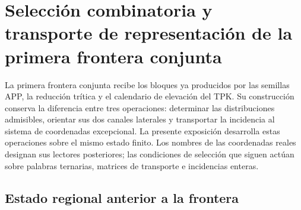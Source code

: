 
\section[Selección y transporte de la primera frontera]{Selección combinatoria y transporte de representación de la primera frontera conjunta}
\label{r36c:sec:frontera}

La primera frontera conjunta recibe los bloques ya producidos por las
semillas APP, la reducción trítica y el calendario de elevación del TPK.
Su construcción conserva la diferencia entre tres operaciones: determinar
las distribuciones admisibles, orientar sus dos canales laterales y
transportar la incidencia al sistema de coordenadas excepcional. La
presente exposición desarrolla estas operaciones sobre el mismo estado
finito. Los nombres de las coordenadas reales designan sus lectores
posteriores; las condiciones de selección que siguen actúan sobre
palabras ternarias, matrices de transporte e incidencias enteras.

\subsection{Estado regional anterior a la frontera}


